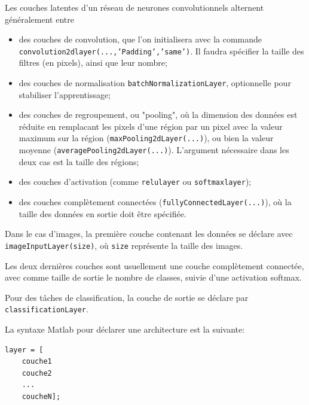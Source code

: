 Les couches latentes d'un réseau de neurones convolutionnels alternent généralement entre 
\begin{itemize}
	\item des couches de convolution, que l'on initialisera avec la commande \texttt{convolution2dlayer(...,'Padding','same')}. Il faudra spécifier la taille des filtres (en pixels), ainsi que leur nombre;
	\item des couches de normalisation \texttt{batchNormalizationLayer}, optionnelle pour stabiliser l'apprentissage;
	\item des couches de regroupement, ou "pooling", où la dimension des données est réduite en remplacant les pixels d'une région par un pixel avec la valeur maximum sur la région (\texttt{maxPooling2dLayer(...)}), ou bien la valeur moyenne (\texttt{averagePooling2dLayer(...)}). L'argument nécessaire dans les deux cas est la taille des régions;
	\item des couches d'activation (comme \texttt{relulayer} ou \texttt{softmaxlayer});
	\item des couches complètement connectées (\texttt{fullyConnectedLayer(...)}), où la taille des données en sortie doit être spécifiée.
\end{itemize}

Dans le cas d'images, la première couche contenant les données se déclare avec \texttt{imageInputLayer(size)}, où \texttt{size} représente la taille des images.

Les deux dernières couches sont usuellement une couche complètement connectée, avec comme taille de sortie le nombre de classes, suivie d'une activation softmax.

Pour des tâches de classification, la couche de sortie se déclare par \texttt{classificationLayer}.

La syntaxe Matlab pour déclarer une architecture est la suivante:
\begin{lstlisting}
layer = [
	couche1
	couche2
	...
	coucheN];
\end{lstlisting}

